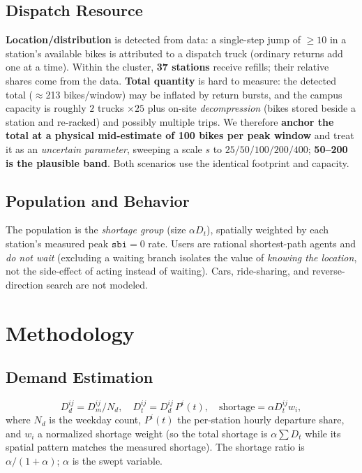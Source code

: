 \documentclass[11pt,a4paper]{article}
\begin{document}
\subsection{Dispatch Resource}
\textbf{Location/distribution} is detected from data: a single-step jump of $\ge 10$ in a station's available bikes is attributed
to a dispatch truck (ordinary returns add one at a time). Within the cluster, \textbf{37 stations} receive refills; their relative
shares come from the data. \textbf{Total quantity} is hard to measure: the detected total ($\approx$213 bikes/window) may be
inflated by return bursts, and the campus capacity is roughly $2$ trucks $\times 25$ plus on-site \emph{decompression} (bikes
stored beside a station and re-racked) and possibly multiple trips. We therefore \textbf{anchor the total at a physical
mid-estimate of 100 bikes per peak window} and treat it as an \emph{uncertain parameter}, sweeping a scale $s$ to
$25/50/100/200/400$; \textbf{50--200 is the plausible band}. Both scenarios use the identical footprint and capacity.

\subsection{Population and Behavior}
The population is the \emph{shortage group} (size $\alpha D_t$), spatially weighted by each station's measured peak
$\texttt{sbi}=0$ rate. Users are rational shortest-path agents and \emph{do not wait} (excluding a waiting branch isolates the
value of \emph{knowing the location}, not the side-effect of acting instead of waiting). Cars, ride-sharing, and reverse-direction
search are not modeled.

\section{Methodology}
\subsection{Demand Estimation}
\begin{equation}
D_d^{ij}=D_m^{ij}/N_d,\quad D_t^{ij}=D_d^{ij}\,P^{i}(t),\quad \text{shortage}=\alpha D_t^{ij} w_i,
\end{equation}
where $N_d$ is the weekday count, $P^i(t)$ the per-station hourly departure share, and $w_i$ a normalized shortage weight (so the
total shortage is $\alpha\sum D_t$ while its spatial pattern matches the measured shortage). The shortage ratio is
$\alpha/(1+\alpha)$; $\alpha$ is the swept variable.
\end{document}
